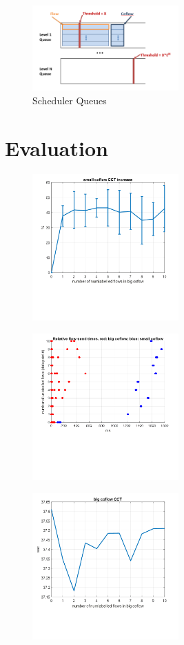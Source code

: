 \documentclass[conference]{IEEEtran}
\begin{document}
\begin{figure}
\includegraphics[width=0.5\textwidth]{queues.png}\caption{Scheduler Queues}
\end{figure}

\section{Evaluation}
\begin{figure}
\includegraphics[width=0.5\textwidth]{graph1.png}
\end{figure}

\begin{figure}
\includegraphics[width=0.5\textwidth]{graph2.png}
\end{figure}

\begin{figure}
\includegraphics[width=0.5\textwidth]{graph3.png}
\end{figure}
\end{document}
